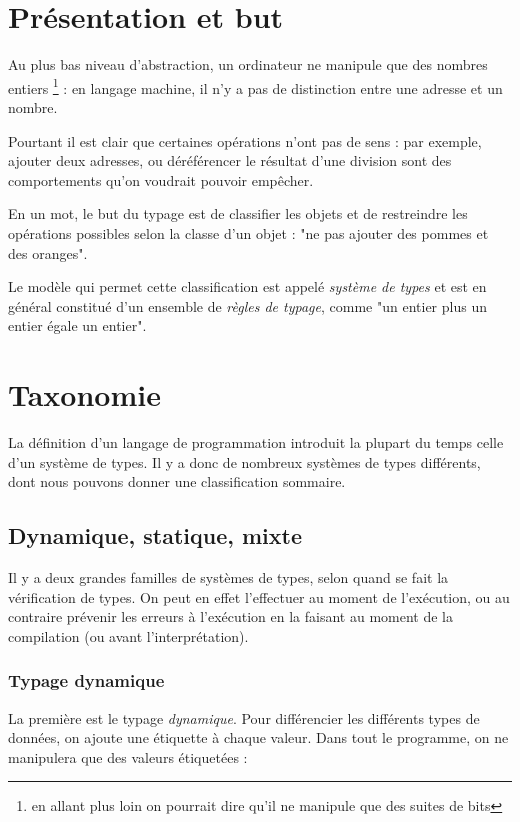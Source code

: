 \section{Présentation et but}

Au plus bas niveau d'abstraction, un ordinateur ne manipule que des nombres
entiers \footnote{en allant plus loin on pourrait dire qu'il ne manipule que des
suites de bits} : en langage machine, il n'y a pas de distinction entre une
adresse et un nombre.

Pourtant il est clair que certaines opérations n'ont pas de sens : par exemple,
ajouter deux adresses, ou déréférencer le résultat d'une division sont des
comportements qu'on voudrait pouvoir empêcher.

En un mot, le but du typage est de classifier les objets et de restreindre les
opérations possibles selon la classe d'un objet : "ne pas ajouter des pommes et
des oranges".

Le modèle qui permet cette classification est appelé \emph{système de types} et
est en général constitué d'un ensemble de \emph{règles de typage}, comme "un
entier plus un entier égale un entier".

\section{Taxonomie}

La définition d'un langage de programmation introduit la plupart du temps celle
d'un système de types. Il y a donc de nombreux systèmes de types différents,
dont nous pouvons donner une classification sommaire.

\subsection{Dynamique, statique, mixte}

Il y a deux grandes familles de systèmes de types, selon quand se fait la
vérification de types. On peut en effet l'effectuer au moment de l'exécution, ou
au contraire prévenir les erreurs à l'exécution en la faisant au moment de la
compilation (ou avant l'interprétation).

\subsubsection{Typage dynamique}

La première est le typage \emph{dynamique}. Pour différencier les différents
types de données, on ajoute une étiquette à chaque valeur. Dans tout le
programme, on ne manipulera que des valeurs étiquetées :

